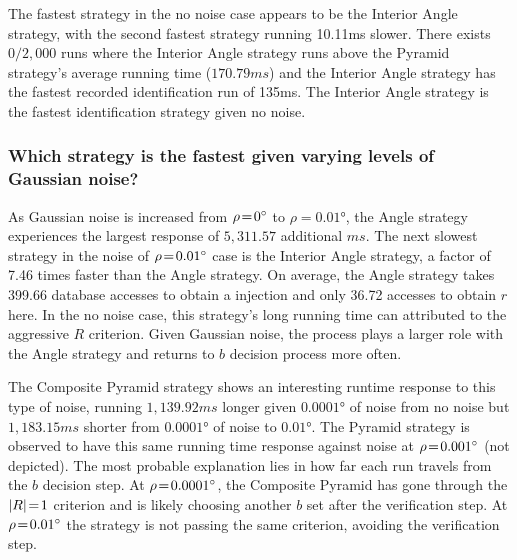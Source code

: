 The fastest strategy in the no noise case appears to be the Interior Angle strategy, with the second fastest strategy
running 10.11\si{ms} slower.
There exists $0 / 2{,}000$ runs where the Interior Angle strategy runs above the Pyramid strategy's average running time
($170.79\si{ms}$) and the Interior Angle strategy has the fastest recorded identification run of 135ms.
The Interior Angle strategy is the fastest identification strategy given no noise.

\subsubsection{Which strategy is the fastest given varying levels of Gaussian noise?}
As Gaussian noise is increased from $\rho\!=\!\ang{0}$ to $\rho=\ang{0.01}$, the Angle strategy experiences the largest
response of $5{,}311.57$ additional $\si{ms}$.
The next slowest strategy in the noise of $\rho\!=\!\ang{0.01}$ case is the Interior Angle strategy, a factor of 7.46 times
faster than the Angle strategy.
On average, the Angle strategy takes 399.66 database accesses to obtain a injection and only 36.72 accesses
to obtain $r$ here.
In the no noise case, this strategy's long running time can attributed to the aggressive $R$ criterion.
Given Gaussian noise, the  process plays a larger role with the Angle strategy and returns to $b$
decision process more often.

The Composite Pyramid strategy shows an interesting runtime response to this type of noise, running $1{,}139.92\si{ms}$
longer given $\ang{0.0001}$ of noise from no noise but $1{,}183.15\si{ms}$ shorter from $\ang{0.0001}$ of noise to
$\ang{0.01}$.
The Pyramid strategy is observed to have this same running time response against noise at $\rho\!=\!\ang{0.001}$
(not depicted).
The most probable explanation lies in how far each run travels from the $b$ decision step.
At $\rho\!=\!\ang{0.0001}$, the Composite Pyramid has gone through the $\left| R \right| \!=\! 1$ criterion and is likely choosing
another $b$ set after the verification step.
At $\rho\!=\!\ang{0.01}$ the strategy is not passing the same criterion, avoiding the verification step.


